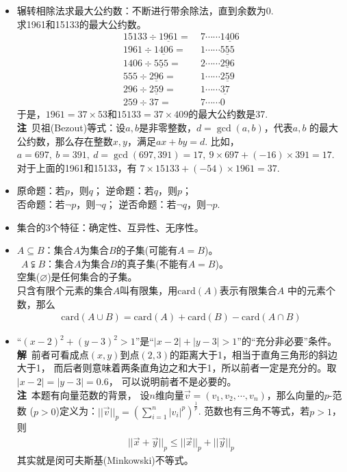 \begin{itemize}[leftmargin=\inteval{\myitemleftmargin}pt,itemsep=
   \inteval{\myitemitempsep}pt,topsep=\inteval{\myitemtopsep}pt]
\item 辗转相除法求最大公约数：不断进行带余除法，直到余数为0. \\
求1961和15133的最大公约数。
\begin{align*}
    15133\div \underline{1961} =&\ 7\cdots\cdots \underline{1406} \\
    1961\div \underline{1406} =&\ 1\cdots\cdots \underline{555} \\
    1406\div \underline{555} =&\ 2\cdots\cdots \underline{296} \\
    555\div \underline{296} =&\ 1\cdots\cdots \underline{259} \\
    296\div \underline{259} =&\ 1\cdots\cdots \underline{37} \\
    259\div 37 =&\ 7\cdots\cdots 0
\end{align*}
于是，$ 1961=37\times 53 $和$ 15133=37\times409 $的最大公约数是37.\\
\textbf{注}\ 贝祖(Bezout)等式：设$ a,b $是非零整数，$ d=\gcd(a,b) $，代表$ a,b $
的最大公约数，那么存在整数$ x,y $，满足$ ax+by=d $. 比如，$ a=697,\ b=391,\ d=\gcd(697,391)=17,\ 9\times 697+(-16)\times 391=17 $. 对于上面的1961和15133，有
$ 7\times 15133+(-54)\times 1961=37 $. 

\item 原命题：若$ p $，则$ q $；
逆命题：若$ q $，则$ p $；\\
否命题：若$ \neg p $，则$ \neg q $；
逆否命题：若$ \neg q $，则$ \neg p $. 

\item 集合的3个特征：确定性、互异性、无序性。

\item $ A \subseteq B $：集合$ A $为集合$ B $的子集(可能有$ A=B $)。\\
$ \ \ A \subsetneqq B $：集合$ A $为集合$ B $的真子集(不能有$ A=B $)。\\
空集($ \varnothing $)是任何集合的子集。\\
只含有限个元素的集合$ A $叫有限集，用$ \mathrm{card}(A) $表示有限集合$ A $
中的元素个数，那么
\begin{gather*}
    \mathrm{card}(A\cup B)=\mathrm{card}(A)+\mathrm{card}(B)-
    \mathrm{card}(A\cap B)
\end{gather*}

\item “$ (x-2)^2+(y-3)^2>1 $”是“$ |x-2|+|y-3|>1 $”的“充分非必要”条件。\\
\textbf{解}\ 前者可看成点$ (x,y) $到点$ (2,3) $的距离大于1，相当于直角三角形的斜边大于1，
而后者则意味着两条直角边之和大于1，所以前者一定是充分的。取$ |x-2|=|y-3|=0.6 $，
可以说明前者不是必要的。\\
\textbf{注}\ 本题有向量范数的背景，
设$ n $维向量$ \vec{v}=(v_1,v_2,\cdots,v_n) $，那么向量的$ p $-范数
($ p > 0 $)定义为：$ ||\vec{v}||_p
=\left(\sum\limits_{i=1}^n |v_i|^p\right)^{\frac{1}{p}} $. 
范数也有三角不等式，若$ p>1 $，则
\begin{align*}
    ||\vec{x}+\vec{y}||_p\leq
    ||\vec{x}||_p+||\vec{y}||_p
\end{align*}
其实就是闵可夫斯基(Minkowski)不等式。


\end{itemize}
